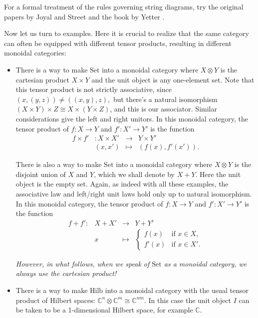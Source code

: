 \documentclass[12pt]{article}
\newcommand{\CC}{\mathbb{C}}
\newcommand{\Hilb}{\mathrm{Hilb}}
\newcommand{\Set}{\mathrm{Set}}
\newcommand{\maps}{\colon}
\newcommand{\iso}{\cong}
\newcommand{\tensor}{\otimes}
\begin{document}
For a formal treatment of the rules governing string 
diagrams, try the original papers by Joyal and Street \cite{JS0}
and the book by Yetter \cite{Yetter}.

Now let us turn to examples.  Here it is crucial to realize that
the same category can often be equipped with different tensor products,
resulting in different monoidal categories:

\begin{itemize}

\item There is a way to make $\Set$ into a monoidal category where
$X \tensor Y$ is the cartesian product $X \times Y$ and the unit
object is any one-element set.  Note that this tensor product is not 
strictly associative, since $(x, (y, z)) \ne ((x, y), z),$ but there's 
a natural isomorphism $(X \times Y) \times Z \iso X \times (Y \times 
Z)$, and this is our associator.  Similar considerations give the left 
and right unitors.  In this monoidal category, the tensor 
product of $f \maps X \to Y$ and $f' \maps X' \to Y'$ is the function
\[
\begin{array}{rccl}
        f \times f' & \maps X\times X'& \to& Y\times Y' \\
                    & (x,x') &\mapsto & (f(x),f'(x')) .
\end{array}
\]

There is also a way to make $\Set$ into a monoidal category where
$X \tensor Y$ is the disjoint union of $X$ and $Y$, which we shall
denote by $X + Y$.  Here the unit object is the empty set.  
Again, as indeed with all these examples, the associative law and 
left/right unit laws hold only up to natural isomorphism.  In this 
monoidal category, the tensor product of $f \maps X \to Y$ and 
$f' \maps X' \to Y'$ is the function
\[
\begin{array}{rccl}
 f+f' \maps & X+X'  &\to&  Y+Y'  \\
           &      x &\mapsto& 
\left\{
\begin{array}{cl} 
f(x) & \text{if $x \in X$,} \\ 
f'(x) & \text{if $x \in X'$.}
\end{array} \right.
\end{array}
\]

{\em However, in what follows, when we speak of $\Set$ as a monoidal
category, we always use the cartesian product!}

\item There is a way to make $\Hilb$ into a monoidal category
with the usual tensor product of Hilbert spaces: $\CC^n \tensor \CC^m \cong 
\CC^{nm}.$  In this case the unit object $I$ can be taken to be a
1-dimensional Hilbert space, for example $\CC$.  


\end{itemize}
\end{document}
